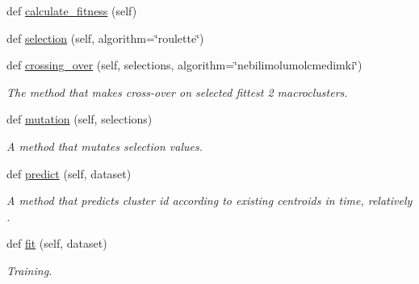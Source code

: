 \begin{DoxyCompactItemize}
def \hyperlink{classStreamClusteringAlgorithms_1_1evoStream_1_1v1_1_1Algorithm_1_1EvoStreamV1_1_1EvoStreamV1_ad63288667a313d001ee6471dafb93553}{calculate\+\_\+fitness} (self)
\item 
def \hyperlink{classStreamClusteringAlgorithms_1_1evoStream_1_1v1_1_1Algorithm_1_1EvoStreamV1_1_1EvoStreamV1_a490fb3a7a255b6008e1e35e35e058480}{selection} (self, algorithm=\char`\"{}roulette\char`\"{})
\item 
def \hyperlink{classStreamClusteringAlgorithms_1_1evoStream_1_1v1_1_1Algorithm_1_1EvoStreamV1_1_1EvoStreamV1_aa754839b3295d3e955d1411e6be10f19}{crossing\+\_\+over} (self, selections, algorithm=\char`\"{}nebilimolumolcmedimki\char`\"{})
\begin{DoxyCompactList}\small\item\em The method that makes cross-\/over on selected fittest 2 macroclusters. \end{DoxyCompactList}\item 
def \hyperlink{classStreamClusteringAlgorithms_1_1evoStream_1_1v1_1_1Algorithm_1_1EvoStreamV1_1_1EvoStreamV1_a536bf586b720f9b5f6c628c44ceb65f3}{mutation} (self, selections)
\begin{DoxyCompactList}\small\item\em A method that mutates selection values. \end{DoxyCompactList}\item 
def \hyperlink{classStreamClusteringAlgorithms_1_1evoStream_1_1v1_1_1Algorithm_1_1EvoStreamV1_1_1EvoStreamV1_aad90f79618d21685408d625ebfe2b98f}{predict} (self, dataset)
\begin{DoxyCompactList}\small\item\em A method that predicts cluster id according to existing centroids in time, relatively . \end{DoxyCompactList}\item 
def \hyperlink{classStreamClusteringAlgorithms_1_1evoStream_1_1v1_1_1Algorithm_1_1EvoStreamV1_1_1EvoStreamV1_acb5a55416fee376bb40664e8292eb679}{fit} (self, dataset)
\begin{DoxyCompactList}\small\item\em Training. \end{DoxyCompactList}\end{DoxyCompactItemize}
